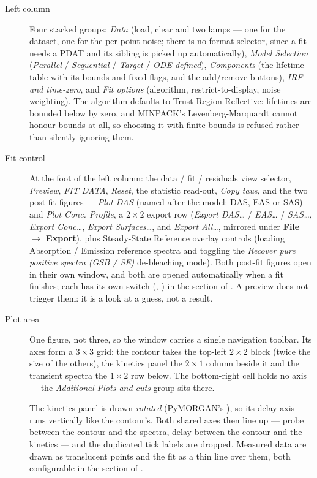 \begin{description}
  \item[Left column] Four stacked groups: \emph{Data} (load, clear and two
    lamps --- one for the dataset, one for the per-point noise; there is no
    format selector, since a fit needs a PDAT and its  sibling is
    picked up automatically), \emph{Model Selection}
    (\emph{Parallel} / \emph{Sequential} / \emph{Target} / \emph{ODE-defined}),
    \emph{Components} (the lifetime table with its bounds and fixed flags, and
    the add/remove buttons), \emph{IRF and time-zero}, and \emph{Fit options}
    (algorithm, restrict-to-display, noise weighting). The algorithm defaults
    to Trust Region Reflective: lifetimes are bounded below by zero, and
    MINPACK's Levenberg-Marquardt cannot honour bounds at all, so choosing it
    with finite bounds is refused rather than silently ignoring them.
  \item[Fit control] At the foot of the left column: the data / fit / residuals
    view selector, \emph{Preview}, \emph{FIT DATA}, \emph{Reset}, the statistic
    read-out, \emph{Copy taus}, and the two post-fit figures ---
    \emph{Plot DAS} (named after the model: DAS, EAS or SAS) and
    \emph{Plot Conc. Profile}, a $2\times2$ export row (\emph{Export DAS\ldots} /
    \emph{EAS\ldots} / \emph{SAS\ldots}, \emph{Export Conc\ldots},
    \emph{Export Surfaces\ldots}, and \emph{Export All\ldots}, mirrored under
    \textbf{File $\to$ Export}), plus Steady-State Reference overlay controls
    (loading Absorption / Emission reference spectra and toggling the
    \emph{Recover pure positive spectra (GSB / SE)} de-bleaching mode). Both
    post-fit figures open in their own window, and both are
    opened automatically when a fit finishes; each has its own switch
    (, ) in the
    \code{[gui]} section of . A preview does not trigger
    them: it is a look at a guess, not a result.
  \item[Plot area] One figure, not three, so the window carries a single
    navigation toolbar. Its axes form a $3\times3$ grid: the contour takes the
    top-left $2\times2$ block (twice the size of the others), the kinetics
    panel the $2\times1$ column beside it and the transient spectra the
    $1\times2$ row below. The bottom-right cell holds no axis --- the
    \emph{Additional Plots and cuts} group sits there.

    The kinetics panel is drawn \emph{rotated} (PyMORGAN's
    ), so its delay axis runs vertically like the contour's.
    Both shared axes then line up --- probe between the contour and the
    spectra, delay between the contour and the kinetics --- and the duplicated
    tick labels are dropped. Measured data are drawn as translucent points and
    the fit as a thin line over them, both configurable in the \code{[plots]}
    section of .


\end{description}
